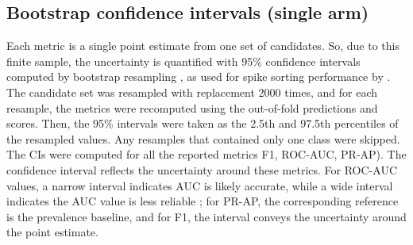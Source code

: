 \documentclass[ %
                    author={Daniel Page},
                supervisor={Dr. Andrew Calway},
                    degree={MSc},
                     title={Some Structural Guidelines for Data Science MSc Theses, Including Those With Long Titles that Run Across Multiple Lines on the Front Page},
                  subtitle={And those including an optional subtitle too, for good measure},
                      type={},
                      year={2021}]{dissertation}
\begin{document}
\subsection{Bootstrap confidence intervals (single arm)}
Each metric is a single point estimate from one set of candidates. So, due to this finite sample, the uncertainty is quantified with 95\% confidence intervals computed by bootstrap resampling \cite{efron_resampling_2001}, as used for spike sorting performance by \cite{troglio_hybrid_2026}. The candidate set was resampled with replacement 2000 times, and for each resample, the metrics were recomputed using the out-of-fold predictions and scores. Then, the 95\% intervals were taken as the 2.5th and 97.5th percentiles of the resampled values. Any resamples that contained only one class were skipped.  The CIs were computed for all the reported metrics F1, ROC-AUC, PR-AP). The confidence interval reflects the uncertainty around these metrics. For ROC-AUC values, a narrow interval indicates AUC is likely accurate, while a wide interval indicates the AUC value is less reliable \cite{corbacioglu_receiver_2023}; for PR-AP, the corresponding reference is the prevalence baseline, and for F1, the interval conveys the uncertainty around the point estimate. 
\end{document}
